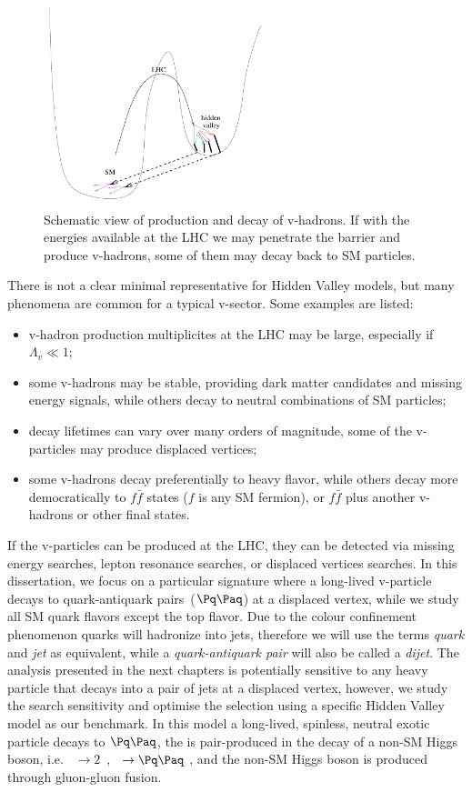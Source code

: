 \begin{figure}[htbp]
\centering
\includegraphics[width=0.6\textwidth]{plots/intro/hiddenvalley.pdf}
\caption{Schematic view of production and decay of v-hadrons. If with the energies
available at the LHC we may penetrate the barrier and produce v-hadrons, some of them may
decay back to SM particles. \label{fig:hv}}
\end{figure}

There is not a clear minimal representative for Hidden Valley models, but
many phenomena are common for a typical v-sector. Some examples are listed:
\begin{itemize}
\item v-hadron production multiplicites at the LHC may be large, especially if $\Lambda_v\ll1$\TeV;
\item some v-hadrons may be stable, providing dark matter candidates and missing energy signals,
while others decay to neutral combinations of SM particles;
\item decay lifetimes can vary over many orders of magnitude, some of the v-particles may produce
displaced vertices;
\item some v-hadrons decay preferentially to heavy flavor, while others decay more democratically
to $f\bar{f}$ states ($f$ is any SM fermion), or $f\bar{f}$ plus another v-hadrons or other final
states.
\end{itemize}

If the v-particles can be produced at the LHC, they can be detected via missing energy 
searches, lepton resonance searches, or displaced vertices searches. In this dissertation,
we focus on a particular signature where a long-lived v-particle 
decays to quark-antiquark pairs~($\qq$) at a displaced vertex,
 while we study all SM quark flavors except the top flavor. Due to the colour confinement 
phenomenon quarks
will hadronize into jets, therefore we will use the terms {\it quark} and  {\it jet} as equivalent,
while a {\it quark-antiquark pair} will also be called a {\it dijet}.
The analysis presented in the next chapters is potentially sensitive 
to any heavy particle that decays into a pair of jets 
 at a displaced vertex, however, we study the search sensitivity and optimise the selection
 using a 
specific Hidden Valley
model as our benchmark. In this model a long-lived, spinless, neutral
exotic particle \X decays to $\qq$,
 the \X is pair-produced in the decay of a non-SM Higgs boson, i.e.  \Higgs~$\to
2$\X~, \X~$\to \qq$ \cite{Strassler:2006ri}, and 
the non-SM Higgs boson is produced through gluon-gluon
fusion. 

